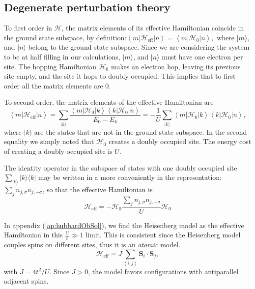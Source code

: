\subsection{Degenerate perturbation theory}

To first order in $\mathcal{H}$, the matrix elements of its effective Hamiltonian coincide in the ground state subspace, by definition:$
\left\langle m | \mathcal{H}_{\text{eff}} | n \right\rangle = \left\langle m | \mathcal{H}_0 | n \right\rangle ,
$ 
where $| m \rangle$, and $| n \rangle$ belong to the ground state subspace.
Since we are considering the system to be at half filling in our calculations, $| m\rangle$, and $| n \rangle$ must have one electron per site.
The hopping Hamiltonian $\mathcal{H}_0$ makes an electron hop, leaving its previous site empty, and the site it hops to doubly occupied.
This implies that to first order all the matrix elements are 0.

To second order, the matrix elements of the effective Hamiltonian are
\begin{equation}
\left \langle m | \mathcal{H}_{\text{eff}} | n \right\rangle = \sum_{ | k \rangle} \frac{\left\langle m | \mathcal{H}_0 | k \right\rangle \left\langle k | \mathcal{H}_0 | n \right\rangle }{E_0 - E_k} =-\frac{1}{U} \sum_{ | k \rangle} \left\langle m | \mathcal{H}_0 | k \right\rangle \left\langle k | \mathcal{H}_0 | n \right\rangle ,
\end{equation}
where $| k \rangle$ are the states that are not in the ground state subspace.
In the second equality we simply noted that $\mathcal{H}_0$ creates a doubly occupied site.
The energy cost of creating a doubly occupied site is $U$. 

The identity operator in the subspace of states with one doubly occupied site
$
\sum_{ | k \rangle} | k \rangle \langle k |
$
may be written in a more conveniently in the representation:
$
\sum_j n_{j,\sigma} n_{j, -\sigma}
$, 
so that the effective Hamiltonian is
\begin{equation}\label{eq:degPert}
\mathcal{H}_{\text{eff}} = - \mathcal{H}_0 \frac{\sum_j n_{j,\sigma} n_{j, -\sigma}}{U} \mathcal{H}_0
\end{equation}

In appendix (\ref{ap:hubbardObSol}), we find the Heisenberg model as the effective Hamiltonian in this $\frac{U}{t} \gg 1$ limit.
This is consistent since the Heisenberg model couples spins on different sites, thus it is an \emph{atomic} model.
\begin{equation}
\mathcal{H}_{\text{eff}} = J \sum_{\left\langle i, j \right\rangle} \bm S_i \cdot \bm S_j ,
\end{equation}
with $J = 4 t^2 / U$.
Since $J > 0$, the model favors configurations with antiparallel adjacent spins.

